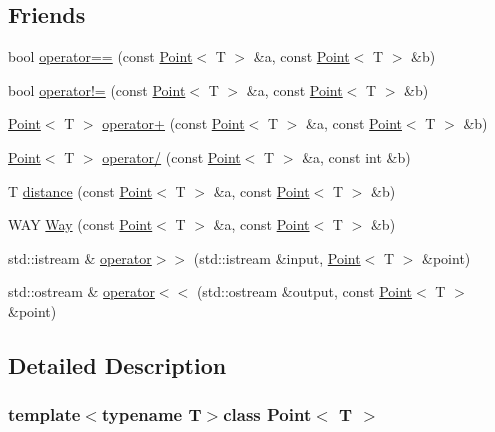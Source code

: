 \subsection*{Friends}
\begin{DoxyCompactItemize}
\item 
bool \hyperlink{class_point_a3022feda6e2cd717d7556545070e5e3d}{operator==} (const \hyperlink{class_point}{Point}$<$ T $>$ \&a, const \hyperlink{class_point}{Point}$<$ T $>$ \&b)
\item 
bool \hyperlink{class_point_a0c7ba65875d6a928df1b4c98ce8e1845}{operator!=} (const \hyperlink{class_point}{Point}$<$ T $>$ \&a, const \hyperlink{class_point}{Point}$<$ T $>$ \&b)
\item 
\hyperlink{class_point}{Point}$<$ T $>$ \hyperlink{class_point_a1c7429e6e5fcf1384ef4e265619afaa5}{operator+} (const \hyperlink{class_point}{Point}$<$ T $>$ \&a, const \hyperlink{class_point}{Point}$<$ T $>$ \&b)
\item 
\hyperlink{class_point}{Point}$<$ T $>$ \hyperlink{class_point_aaff8e9d6aac135ddbb6c6bd38a1d6e62}{operator/} (const \hyperlink{class_point}{Point}$<$ T $>$ \&a, const int \&b)
\item 
T \hyperlink{class_point_a216c89dc6b71108a752facddcd5049e6}{distance} (const \hyperlink{class_point}{Point}$<$ T $>$ \&a, const \hyperlink{class_point}{Point}$<$ T $>$ \&b)
\item 
W\-A\-Y \hyperlink{class_point_a5693f743fefbc2b3c12a77c99167c88d}{Way} (const \hyperlink{class_point}{Point}$<$ T $>$ \&a, const \hyperlink{class_point}{Point}$<$ T $>$ \&b)
\item 
std\-::istream \& \hyperlink{class_point_a58d661e665093b97b37b95c61f172fd3}{operator$>$$>$} (std\-::istream \&input, \hyperlink{class_point}{Point}$<$ T $>$ \&point)
\item 
std\-::ostream \& \hyperlink{class_point_a7c2c33adcc5b50243ccd7cb598cfabbf}{operator$<$$<$} (std\-::ostream \&output, const \hyperlink{class_point}{Point}$<$ T $>$ \&point)
\end{DoxyCompactItemize}


\subsection{Detailed Description}
\subsubsection*{template$<$typename T$>$class Point$<$ T $>$}

